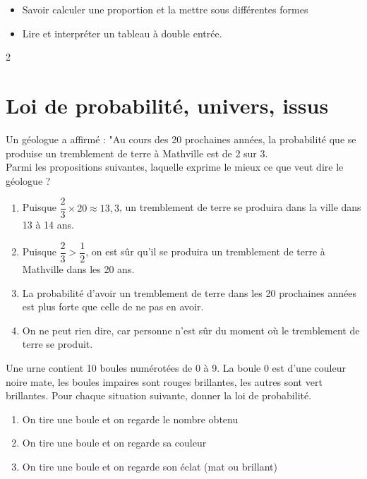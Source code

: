 \documentclass[10pt,a4paper]{article}
\begin{document}

\vspace{-0.3cm}

\begin{prerequis}
\begin{itemize}
    \item Savoir calculer une proportion et la mettre sous différentes formes
    \item Lire et interpréter un tableau à double entrée.
\end{itemize}

\end{prerequis}
\begin{multicols}{2}

\section{Loi de probabilité, univers, issus}

\begin{exo}
Un géologue a affirmé : "Au cours des 20 prochaines années, la probabilité que se produise un tremblement de terre à Mathville est de 2 sur 3.\\
Parmi les propositions suivantes, laquelle exprime le mieux ce que veut dire le géologue ?
\begin{enumerate}[label=\Alph* : ]
    \item Puisque \(\dfrac{2}{3}\times 20 \approx 13,3\), un tremblement de terre se produira dans la ville dans 13 à 14 ans.
    \item Puisque \(\dfrac{2}{3}>\dfrac{1}{2}\), on est sûr qu'il se produira un tremblement de terre à Mathville dans les 20 ans.
    \item La probabilité  d'avoir un tremblement de terre dans les 20 prochaines années est plus forte que celle de ne pas en avoir.
    \item On ne peut rien dire, car personne n'est sûr du moment où le tremblement de terre se produit.
\end{enumerate}
\end{exo}

\begin{exo}
    Une urne contient 10 boules numérotées de 0 à 9. La boule 0 est d'une couleur noire mate, les boules impaires sont rouges brillantes, les autres sont vert brillantes.\medskip
    Pour chaque situation suivante, donner la loi de probabilité.
    \begin{enumerate}
        \item On tire une boule et on regarde le nombre obtenu
        \item On tire une boule et on regarde sa couleur
        \item On tire une boule et on regarde son éclat (mat ou brillant)
    \end{enumerate}
\end{exo}


\end{multicols}
\end{document}

